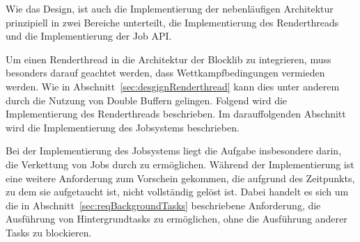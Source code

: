 Wie das Design, ist auch die Implementierung der nebenläufigen Architektur prinzipiell in zwei Bereiche unterteilt, die Implementierung des Renderthreads und die Implementierung der Job API.

Um einen Renderthread in die Architektur der Blocklib zu integrieren, muss besonders darauf geachtet werden, dass Wettkampfbedingungen vermieden werden. Wie in Abschnitt~\ref{sec:desgignRenderthread} kann dies unter anderem durch die Nutzung von Double Buffern gelingen. Folgend wird die Implementierung des Renderthreads beschrieben. Im darauffolgenden Abschnitt wird die Implementierung des Jobsystems beschrieben.

Bei der Implementierung des Jobsystems liegt die Aufgabe insbesondere darin, die Verkettung von Jobs durch  zu ermöglichen. Während der Implementierung ist eine weitere Anforderung zum Vorschein gekommen, die aufgrund des Zeitpunkts, zu dem sie aufgetaucht ist, nicht vollständig gelöst ist. Dabei handelt es sich um die in Abschnitt~\ref{sec:reqBackgroundTasks} beschriebene Anforderung, die Ausführung von Hintergrundtasks zu ermöglichen, ohne die Ausführung anderer Tasks zu blockieren.